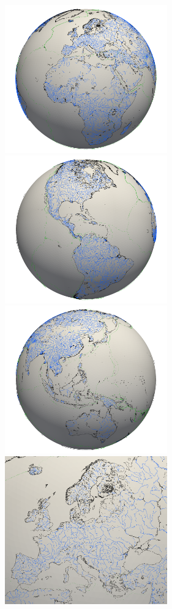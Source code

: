 \begin{center}
\includegraphics[width=7cm]{python_codes/fieldstone_69/images/01}
\includegraphics[width=7cm]{python_codes/fieldstone_69/images/02}\\
\includegraphics[width=7cm]{python_codes/fieldstone_69/images/03}
\includegraphics[width=7cm]{python_codes/fieldstone_69/images/04}
\end{center}


